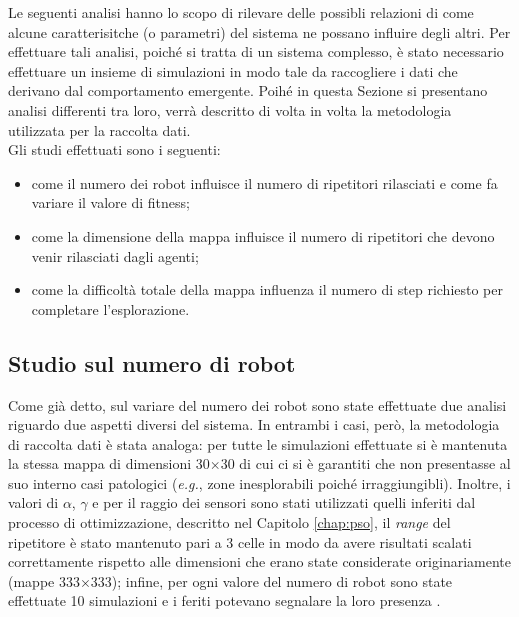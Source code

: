 Le seguenti analisi hanno lo scopo di rilevare delle possibli relazioni di come alcune caratterisitche (o parametri) del sistema ne possano influire degli altri.
Per effettuare tali analisi, poiché si tratta di un sistema complesso, è stato necessario effettuare un insieme di simulazioni in modo tale da raccogliere i dati che derivano dal comportamento emergente.
Poihé in questa Sezione si presentano analisi differenti tra loro, verrà descritto di volta in volta la metodologia utilizzata per la raccolta dati.\\
Gli studi effettuati sono i seguenti:\begin{itemize}
	\item come il numero dei robot influisce il numero di ripetitori rilasciati e come fa variare il valore di fitness;
	\item come la dimensione della mappa influisce il numero di ripetitori che devono venir rilasciati dagli agenti;
	\item come la difficoltà totale della mappa influenza il numero di step richiesto per completare l'esplorazione.
\end{itemize}
\subsection{Studio sul numero di robot}
\label{subsec:nrobots}
Come già detto, sul variare del numero dei robot sono state effettuate due analisi riguardo due aspetti diversi del sistema.
In entrambi i casi, però, la metodologia di raccolta dati è stata analoga: per tutte le simulazioni effettuate si è mantenuta la stessa mappa di dimensioni 30$\times$30 di cui ci si è garantiti che non presentasse al suo interno casi patologici (\textit{e.g.}, zone inesplorabili poiché irraggiungibli).
Inoltre, i valori di $\alpha$, $\gamma$ e per il raggio dei sensori sono stati utilizzati quelli inferiti dal processo di ottimizzazione, descritto nel Capitolo \ref{chap:pso}, il \textit{range} del ripetitore è stato mantenuto pari a 3 celle in modo da avere risultati scalati correttamente rispetto alle dimensioni che erano state considerate originariamente (mappe 333$\times$333); infine, per ogni valore del numero di robot sono state effettuate 10 simulazioni e i feriti potevano segnalare la loro presenza .

